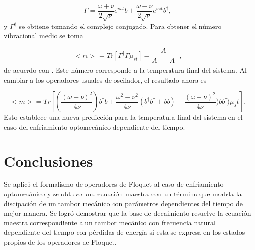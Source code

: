 \documentclass[a4paper,10pt]{report}
\begin{document}
\begin{equation}
\Gamma = \frac{\omega+\nu}{2\sqrt{\nu}}e^{i\omega t}b+\frac{\omega-\nu}{2\sqrt{\nu}}e^{i\omega t}b^\dagger,
\end{equation} y $\Gamma^\dagger$ se obtiene tomando el complejo conjugado. Para obtener el número vibracional medio se toma

\begin{equation}
<m> = Tr[\Gamma^\dagger \Gamma \mu_{st}] = \frac{A_+}{A_+ - A_-},
\end{equation} de acuerdo con \cite{BarberisLC}. Este número corresponde a la temperatura final del sistema. Al cambiar a los operadores usuales de oscilador, el resultado ahora es

\begin{equation}
<m> = Tr[(\frac{(\omega + \nu )^2}{4\nu})b^\dagger b +\frac{\omega^2 - \nu^2}{4\nu}(b^\dagger b^\dagger +bb) +\frac{(\omega - \nu )^2}{4\nu}) b b^\dagger)\mu_st].
\end{equation} Esto establece una nueva predicción para la temperatura final del sistema en el caso del enfriamiento optomecánico dependiente del tiempo.


\chapter{Conclusiones}

Se aplicó el formalismo de operadores de Floquet al caso de enfriamiento optomecánico y se obtuvo una ecuación maestra con un término que modela la discipación de un tambor mecánico con parámetros dependientes del tiempo de mejor manera.  Se logró demostrar que la base de decaimiento resuelve la ecuación maestra correspondiente a un tambor mecánico con frecuencia natural dependiente del tiempo con pérdidas de energía si esta se expresa en los estados propios de los operadores de Floquet.
\end{document}
